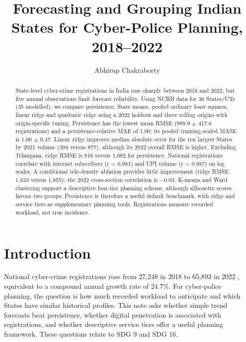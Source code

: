 \documentclass[runningheads]{llncs}
\title{Forecasting and Grouping Indian States for Cyber-Police Planning, 2018--2022}
\author{Abhirup Chakraborty\inst{1}}
\institute{Department of Computer Science, Ramanujan College, University of Delhi, New Delhi, India}
\begin{document}
\raggedbottom
\maketitle
\begin{abstract}
State-level cyber-crime registrations in India rose sharply between 2018 and 2022, but five annual observations limit forecast reliability. Using NCRB data for 36 States/UTs (35 modelled), we compare persistence, State means, pooled ordinary least squares, linear ridge and quadratic ridge using a 2022 holdout and three rolling origins with origin-specific tuning. Persistence has the lowest mean RMSE (999.9 \ensuremath{\pm} 417.6 registrations) and a persistence-relative MAE of 1.00; its pooled training-scaled MASE is 1.00 \ensuremath{\pm} 0.47. Linear ridge improves median absolute error for the ten largest States by 2021 volume (394 versus 877), although its 2022 overall RMSE is higher. Excluding Telangana, ridge RMSE is 816 versus 1,082 for persistence. National registrations correlate with internet subscribers (r = 0.981) and UPI volume (r = 0.987) on log scales. A conditional tele-density ablation provides little improvement (ridge RMSE 1,833 versus 1,855); the 2022 cross-section correlation is \ensuremath{-}0.03. K-means and Ward clustering support a descriptive four-tier planning scheme, although silhouette scores favour two groups. Persistence is therefore a useful default benchmark, with ridge and service tiers as supplementary planning tools. Registrations measure recorded workload, not true incidence.
\end{abstract}

\FloatBarrier
\section{Introduction}
National cyber-crime registrations rose from 27,248 in 2018 to 65,893 in 2022 \cite{ref1,ref2}, equivalent to a compound annual growth rate of 24.7\%. For cyber-police planning, the question is how much recorded workload to anticipate and which States have similar historical profiles. This note asks whether simple trend forecasts beat persistence, whether digital penetration is associated with registrations, and whether descriptive service tiers offer a useful planning framework. These questions relate to SDG 9 and SDG 16.

\FloatBarrier
\end{document}
